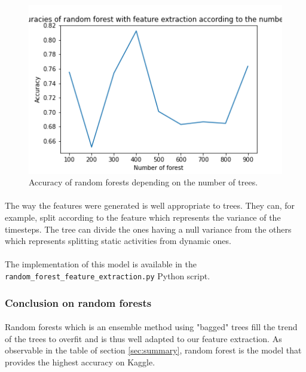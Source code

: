 \documentclass[a4paper, 11pt, oneside]{article}
\begin{document}
\begin{figure}[H]
\centering
\includegraphics[scale=0.4]{rf/random_forest_feature_extraction.png}
\caption{Accuracy of random forests depending on the number of trees.}
\label{fig:rf-feature-extraction}
\end{figure}

\paragraph{}The way the features were generated is well appropriate to trees. They can, for example, split according to the feature which represents the variance of the timesteps. The tree can divide the ones having a null variance from the others which represents splitting static activities from dynamic ones.

\paragraph{}The implementation of this model is available in the \texttt{random\_forest\_feature\_extraction.py} Python script.

\subsubsection{Conclusion on random forests}
\paragraph{}Random forests which is an ensemble method using "bagged" trees fill the trend of the trees to overfit and is thus well adapted to our feature extraction. As observable in the table of section \ref{sec:summary}, random forest is the model that provides the highest accuracy on Kaggle.
\end{document}

